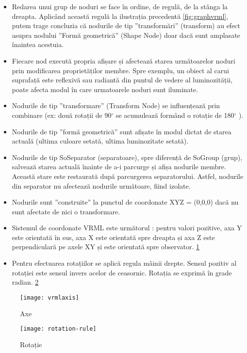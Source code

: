\begin{itemize}
\item Redarea unui grup de noduri se face în ordine, de regulă, de la stânga la dreapta. Aplicând această regulă la ilustrația precedentă \ref{fig:graphvrml}, putem trage concluzia că nodurile de tip ”transformări” (transform) au efect asupra nodului ”Formă geometrică” (Shape Node) doar dacă sunt amplasate înaintea acestuia.
\item Fiecare nod execută propria afișare și afectează starea următoarelor noduri prin modificarea proprietăților membre. Spre exemplu, un obiect al carui suprafață este reflexivă sau radiantă din puntul de vedere al luminozității, poate afecta modul în care urmatoarele noduri sunt iluminate.
\item Nodurile de tip ”transformare” (Transform Node) se influențează prin combinare (ex: două rotații de 90$^{\circ}$ se acumulează formând o rotație de 180$^{\circ}$ ).
\item Nodurile de tip ”formă geometrică” sunt afișate în modul dictat de starea actuală (ultima culoare setată, ultima luminozitate setată).
\item Nodurile de tip SoSeparator (separatoare), spre diferență de SoGroup (grup), salvează starea actuală înainte de a-i parcurge și afișa nodurile membre. Această stare este restaurată după parcurgerea separatorului. Astfel, nodurile din separator nu afectează nodurile următoare, fiind izolate.
\item Nodurile sunt ”construite” la punctul de coordonate XYZ = (0,0,0) dacă nu sunt afectate de nici o transformare.
\item Sistemul de coordonate VRML este următorul : pentru valori pozitive, axa Y este orientată în sus, axa X este orientată spre dreapta și axa Z este perpendiculară pe axele XY și este orientată spre observator. \ref{fig:vrmlaxes}
\item Pentru efectuarea rotațiilor se aplică regula mâinii drepte. Sensul pozitiv al rotației este sensul invers acelor de ceasornic. Rotația se exprimă în grade radian. \ref{fig:vrmlrot}
\end{itemize} 

\begin{figure}[h]
    \centering
    \texttt{[image: vrmlaxis]}
    \caption{Axe}
    \label{fig:vrmlaxes}
\end{figure}

\begin{figure}[h]
    \centering
    \texttt{[image: rotation-rule]}
    \caption{Rotație}
    \label{fig:vrmlrot}
\end{figure}

